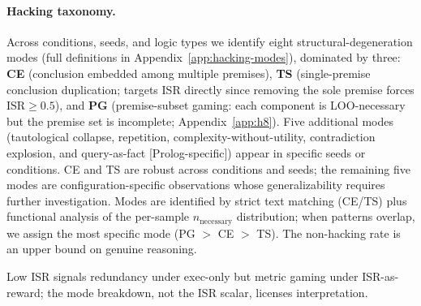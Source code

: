 \paragraph{Hacking taxonomy.}
Across conditions, seeds, and logic types we identify eight structural-degeneration modes (full definitions in Appendix~\ref{app:hacking-modes}), dominated by three: \textbf{CE} (conclusion embedded among multiple premises), \textbf{TS} (single-premise conclusion duplication; targets ISR directly since removing the sole premise forces $\text{ISR}\geq 0.5$), and \textbf{PG} (premise-subset gaming: each component is LOO-necessary but the premise set is incomplete; Appendix~\ref{app:h8}).
Five additional modes (tautological collapse, repetition, complexity-without-utility, contradiction explosion, and query-as-fact [Prolog-specific]) appear in specific seeds or conditions.
CE and TS are robust across conditions and seeds; the remaining five modes are configuration-specific observations whose generalizability requires further investigation.
Modes are identified by strict text matching (CE/TS) plus functional analysis of the per-sample $n_{\text{necessary}}$ distribution; when patterns overlap, we assign the most specific mode (PG $>$ CE $>$ TS).
The non-hacking rate is an upper bound on genuine reasoning.

Low ISR signals redundancy under exec-only but metric gaming under ISR-as-reward; the mode breakdown, not the ISR scalar, licenses interpretation.

